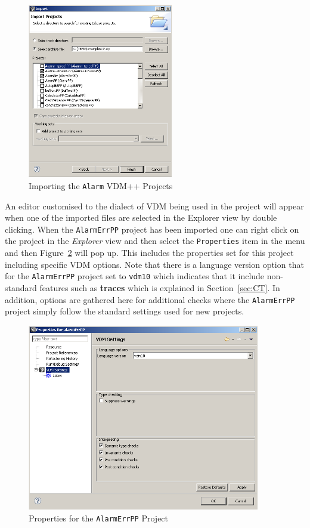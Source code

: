 \begin{figure}[!htb]
\begin{center}
  \includegraphics[width=2.5in]{figures/importalarmprofs}
  \caption[labelInTOC]{Importing the \texttt{Alarm} VDM++ Projects}
  \label{fig:importalarm}
\end{center}
\end{figure}

An editor customised to the dialect of VDM being used in the project
will appear when one of the imported files are selected in the
Explorer view by double clicking. When the
\texttt{AlarmErrPP} project has been imported one can right click on the
project in the \emph{Explorer} view and then select the
\texttt{Properties} item in the menu and then
Figure~\ref{fig:settings} will pop up. This includes the properties set
for this project including specific VDM options. Note that there is a 
language version option that for the \texttt{AlarmErrPP}
project set to \texttt{vdm10} which indicates that it include
non-standard features such as {\bf\ttfamily traces} which is explained 
in Section~\ref{sec:CT}. In addition, options are gathered here for 
additional checks where the \texttt{AlarmErrPP} project simply follow 
the standard settings used for new projects.

\begin{figure}[!htb]
\begin{center}
  \includegraphics[width=4.0in]{figures/settings}
  \caption[labelInTOC]{Properties for the \texttt{AlarmErrPP} Project}
  \label{fig:settings}
\end{center}
\end{figure}

